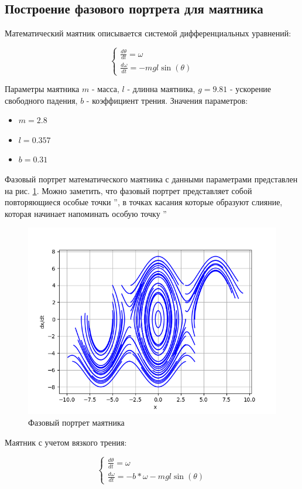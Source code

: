 \subsection{Построение фазового портрета для маятника}

Математический маятник описывается системой дифференциальных уравнений:

$$
\begin{cases}
{\frac{d \theta}{dt}} = \omega \\ 
{\frac{d \omega}{dt}} = - m g l \sin(\theta)
\end{cases}
$$

Параметры маятника $m$ - масса, $l$ - длинна маятника, $g = 9.81$ - ускорение свободного падения, $b$ - коэффициент трения.
Значения параметров:

\begin{itemize}
	\item $m = 2.8$
	\item $l = 0.357$
	\item $b = 0.31$
\end{itemize}

Фазовый портрет математического маятника с данными параметрами представлен на рис. \ref{fig:19}.
Можно заметить, что фазовый портрет представляет собой повторяющиеся особые точки \textquotedblright,
в точках касания которые образуют слияние, которая начинает напоминать особую точку \textquotedblright

\begin{figure}[H]
	\centering
	\includegraphics[width=0.7\linewidth]{body/images/Pendulum-system.png}
	\caption{Фазовый портрет маятника}
	\label{fig:19}
\end{figure}

Маятник с учетом вязкого трения:

$$
\begin{cases}
{\frac{d \theta}{dt}} = \omega \\ 
{\frac{d \omega}{dt}} = -b * \omega - m g l \sin(\theta)
\end{cases}
$$

